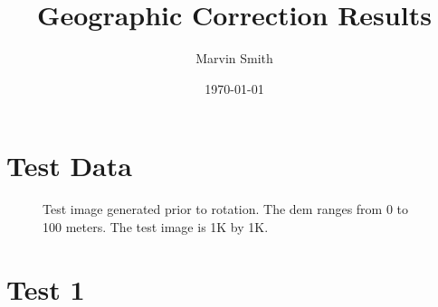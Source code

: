 \documentclass[12pt]{report}
\title{Geographic Correction Results}
\author{Marvin Smith}
\date{\today}
\begin{document}
\maketitle

\section*{Test Data}
\begin{figure}[!h]
\centering
{}
\caption{Test image generated prior to rotation.  The dem ranges from 0 to 100 meters. The test image is 1K by 1K.}
\end{figure}


\clearpage
\section*{Test 1}
\end{document}
